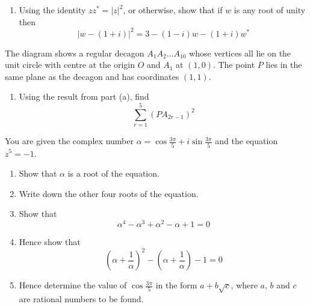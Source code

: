 \documentclass[leqno]{article}
\begin{document}
\begin{enumerate}[
  label=\textbf{\arabic*.},
  leftmargin=*,
  topsep=0pt,
  partopsep=0pt,
  parsep=0pt
]
\begin{figure}[H]
\end{figure}


\begin{enumerate}[label=\textbf{(\alph*)}]
  \item Using the identity $zz^*=|z|^2$, or otherwise, show that if $w$ is any root of unity then
  \[
  |w-(1+i)|^2=3-(1-i)w-(1+i)w^*
  \]
\end{enumerate}
The diagram shows a regular decagon $A_1A_2\ldots A_{10}$ whose vertices all lie on the unit circle with centre at the origin $O$ and $A_1$ at $(1,0)$. The point $P$ lies in the same plane as the decagon and has coordinates $(1,1)$. \\

\begin{enumerate}[label=\textbf{(\alph*)}, resume]
  \item Using the result from part (a), find
\[
\sum_{r=1}^{5}(PA_{2r-1})^2
\]
\end{enumerate}

\newpage


\questionitem

You are given the complex number $\alpha=\cos \frac{3\pi}{5}+i\sin \frac{3\pi}{5}$ and the equation $z^5=-1$. \\
\begin{enumerate}[label=\textbf{(\alph*)}]
  \item Show that $\alpha$ is a root of the equation.  \\
  \item Write down the other four roots of the equation.  \\
  \item Show that
  \[
  \alpha^4-\alpha^3+\alpha^2-\alpha+1=0
  \]
  \item Hence show that
  \[
  \left(\alpha+\frac{1}{\alpha}\right)^2-\left(\alpha+\frac{1}{\alpha}\right)-1=0
  \]
  \item Hence determine the value of $\cos \frac{3\pi}{5}$ in the form $a+b\sqrt{c}$, where $a$, $b$ and $c$ are rational numbers to be found.  \\
\end{enumerate}


\end{enumerate}
\end{document}
